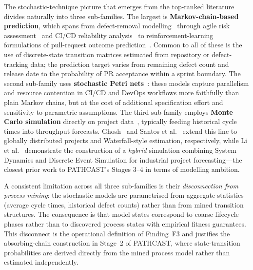The stochastic-technique picture that emerges from the top-ranked literature
divides naturally into three sub-families. The largest is
\textbf{Markov-chain-based prediction}, which spans from defect-removal
modelling~\cite{tian2005,jeon2015} through agile risk
assessment~\cite{lunesu2021} and CI/CD reliability
analysis~\cite{bhadra2022,bhadra2023} to reinforcement-learning formulations
of pull-request outcome prediction~\cite{joshi2024}. Common to all of these
is the use of discrete-state transition matrices estimated from repository or
defect-tracking data; the prediction target varies from remaining defect count
and release date to the probability of PR acceptance within a sprint
boundary. The second sub-family uses \textbf{stochastic Petri
nets}~\cite{benmesmia2021,bhadra2022,bhadra2023}: these models capture
parallelism and resource contention in CI/CD and DevOps workflows more
faithfully than plain Markov chains, but at the cost of additional
specification effort and sensitivity to parametric assumptions. The third
sub-family employs \textbf{Monte Carlo simulation} directly on project
data~\cite{magennis2015,lunesu2021,li2020}, typically feeding historical cycle
times into throughput forecasts. Ghosh~\cite{ghosh2009} and Santos et
al.~\cite{santos2018} extend this line to globally distributed projects and
Waterfall-style estimation, respectively, while Li et al.~\cite{li2020}
demonstrate the construction of a \emph{hybrid} simulation combining
System Dynamics and Discrete Event Simulation for industrial project
forecasting---the closest prior work to PATHCAST's Stages 3--4 in terms of
modelling ambition.

A consistent limitation across all three sub-families is their
\emph{disconnection from process mining}: the stochastic models are
parametrised from aggregate statistics (average cycle times, historical
defect counts) rather than from mined transition structures. The consequence
is that model states correspond to coarse lifecycle phases rather than to
discovered process states with empirical fitness guarantees. This disconnect
is the operational definition of Finding~F3 and justifies the absorbing-chain
construction in Stage~2 of PATHCAST, where state-transition probabilities are
derived directly from the mined process model rather than estimated
independently.



